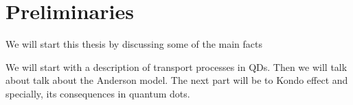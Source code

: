 \chapter{Preliminaries}

We will start this thesis by discussing some of the main facts 

We will start with a  description of transport processes in QDs. Then we will talk about talk about the Anderson model. The next part will be to Kondo effect and specially, its consequences in quantum dots.  


